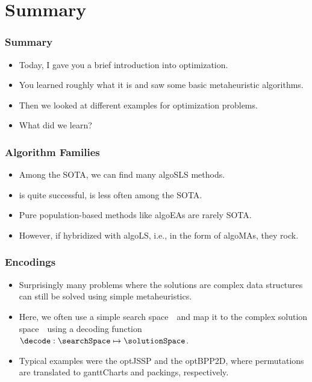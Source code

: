 \documentclass[aspectratio=169,mathserif,notheorems]{beamer}%
\begin{document}
\section{Summary}%
%
\begin{frame}%
\frametitle{Summary}%
\begin{itemize}%
\item Today, I gave you a brief introduction into optimization.%
\item<2-> You learned roughly what it is and saw some basic \gls{metaheuristic} algorithms.%
\item<3-> Then we looked at different examples for optimization problems.%
\item<4-> What did we learn?%
\end{itemize}%
\end{frame}%
%
\begin{frame}%
\frametitle{Algorithm Families}%
\begin{itemize}%
\item Among the \gls{SOTA}, we can find many \gls{algoSLS} methods.%
\item<2->  is quite successful,  is less often among the \gls{SOTA}.%
\item<3-> Pure population-based methods like \glspl{algoEA} are rarely \gls{SOTA}.%
\item<4-> However, if hybridized with \gls{algoLS}, i.e., in the form of \glspl{algoMA}, they rock.%
\end{itemize}%
\end{frame}%
%
\begin{frame}%
\frametitle{Encodings}%
\begin{itemize}%
\item Surprisingly many problems where the solutions are complex data structures can still be solved using simple \glspl{metaheuristic}.%
\item<2-> Here, we often use a simple search space~\searchSpace\ and map it to the complex solution space~\solutionSpace\ using a decoding function~$\decode:\searchSpace\mapsto\solutionSpace$.%
\item<3-> Typical examples were the \gls{optJSSP} and the \gls{optBPP2D}, where permutations are translated to \glspl{ganttChart} and packings, respectively.%
\end{itemize}%
\end{frame}%
%
\end{document}
